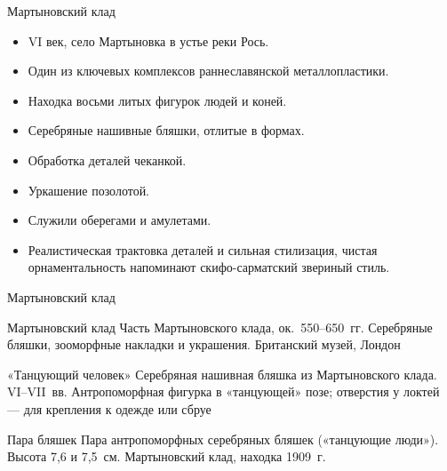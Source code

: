 \begin{frame}{Мартыновский клад}
  \begin{itemize}
    \item VI век, село Мартыновка в устье реки Рось.
    \item Один из ключевых комплексов раннеславянской
    металлопластики.
    \item Находка восьми литых фигурок людей и коней.
    \item Серебряные нашивные бляшки, отлитые в формах.
    \item Обработка деталей чеканкой.
    \item Уркашение позолотой.
    \item Служили оберегами и амулетами.
    \item Реалистическая трактовка деталей и сильная стилизация, чистая орнаментальность напоминают скифо-сарматский звериный стиль.
  \end{itemize}
\end{frame}

\begin{frame}{Мартыновский клад}
    {}
\end{frame}

\begin{frame}{Мартыновский клад}
    {Часть Мартыновского клада, ок.\ 550--650~гг. Серебряные бляшки,
     зооморфные накладки и украшения. Британский музей, Лондон}
\end{frame}

\begin{frame}{«Танцующий человек»}
    {Серебряная нашивная бляшка из Мартыновского клада.
     VI--VII~вв. Антропоморфная фигурка в «танцующей» позе;
     отверстия у локтей --- для крепления к одежде или сбруе}
\end{frame}

\begin{frame}{Пара бляшек}
    {Пара антропоморфных серебряных бляшек («танцующие люди»).
     Высота 7,6 и 7,5~см. Мартыновский клад, находка 1909~г.}
\end{frame}

